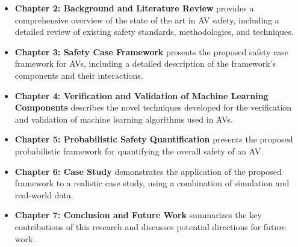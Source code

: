 \begin{itemize}
    \item \textbf{Chapter 2: Background and Literature Review} provides a comprehensive overview of the state of the art in AV safety, including a detailed review of existing safety standards, methodologies, and techniques.
    \item \textbf{Chapter 3: Safety Case Framework} presents the proposed safety case framework for AVs, including a detailed description of the framework's components and their interactions.
    \item \textbf{Chapter 4: Verification and Validation of Machine Learning Components} describes the novel techniques developed for the verification and validation of machine learning algorithms used in AVs.
    \item \textbf{Chapter 5: Probabilistic Safety Quantification} presents the proposed probabilistic framework for quantifying the overall safety of an AV.
    \item \textbf{Chapter 6: Case Study} demonstrates the application of the proposed framework to a realistic case study, using a combination of simulation and real-world data.
    \item \textbf{Chapter 7: Conclusion and Future Work} summarizes the key contributions of this research and discusses potential directions for future work.
\end{itemize}